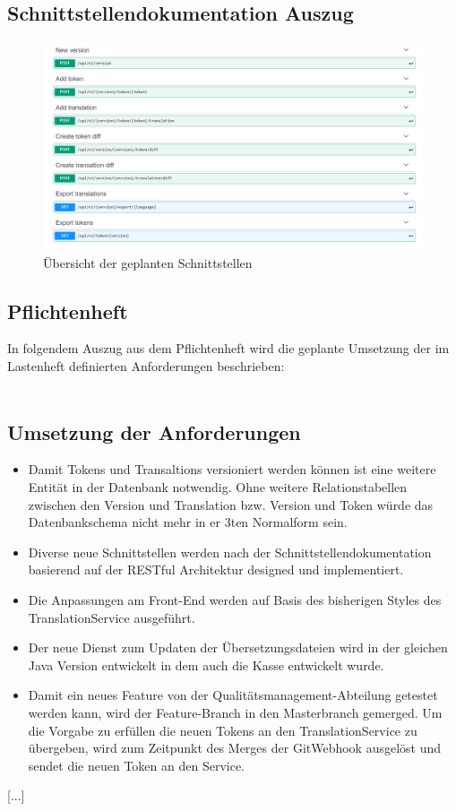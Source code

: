 \documentclass[10pt, oneside, ngerman]{article}
\begin{document}
  \subsection{Schnittstellendokumentation Auszug}\label{sec:swa:ts}
  \begin{figure}[htb]
    \centering
    \includegraphics[width=\textwidth]{Swagger_API_Overview.PNG}
    \caption{Übersicht der geplanten Schnittstellen}
  \end{figure}
  \newpage
  \subsection{Pflichtenheft}\label{sec:pflichtenheft}
  In folgendem Auszug aus dem Pflichtenheft wird die geplante Umsetzung der im Lastenheft definierten
  Anforderungen beschrieben:\\ \\
  \subsection*{Umsetzung der Anforderungen}
  \begin{itemize}
    \item Damit Tokens und Transaltions versioniert werden können ist eine weitere Entität in der Datenbank notwendig. 
    Ohne weitere Relationstabellen zwischen den Version und Translation bzw. Version und Token würde das Datenbankschema nicht mehr in er 3ten Normalform sein. 
    \item Diverse neue Schnittstellen werden nach der Schnittstellendokumentation basierend auf der RESTful Architektur designed und implementiert.
    \item Die Anpassungen am Front-End werden auf Basis des bisherigen Styles des TranslationService ausgeführt.
    \item Der neue Dienst zum Updaten der Übersetzungsdateien wird in der gleichen Java Version entwickelt in dem auch die Kasse entwickelt wurde.
    \item Damit ein neues Feature von der Qualitätsmanagement-Abteilung getestet werden kann, wird der Feature-Branch in den Masterbranch gemerged. Um die Vorgabe zu erfüllen die neuen Tokens an den TranslationService zu übergeben,
    wird zum Zeitpunkt des Merges der GitWebhook ausgelöst und sendet die neuen Token an den Service.
  \end{itemize}
  \vspace{2cm}
  \begin{center}
    [...]
  \end{center}
  \newpage
\end{document}
